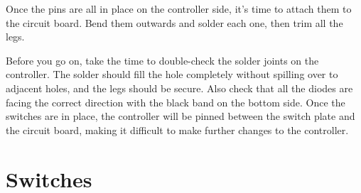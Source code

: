 \documentclass{article}
\begin{document}
Once the pins are all in place on the controller side, it's time to
attach them to the circuit board. Bend them outwards and solder each
one, then trim all the legs.

\vspace{1em}
\noindent{}
\vspace{1em}

Before you go on, take the time to double-check the solder joints on
the controller. The solder should fill the hole completely without
spilling over to adjacent holes, and the legs should be secure. Also
check that all the diodes are facing the correct direction with the
black band on the bottom side. Once the switches are in place, the
controller will be pinned between the switch plate and the circuit
board, making it difficult to make further changes to the controller.

\section{Switches}

\noindent{}
\end{document}
